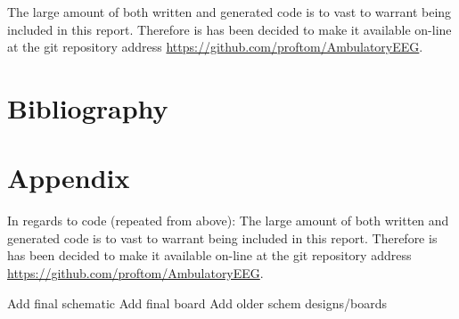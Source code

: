 \documentclass[]{article}
\begin{document}
The large amount of both written and generated code is to vast to warrant being included in this report. Therefore is has been decided to make it available on-line at the git repository address 
\url{https://github.com/proftom/AmbulatoryEEG}.
\clearpage
\section{Bibliography}

\nocite{*}

\printbibliography

\section{Appendix}

In regards to code (repeated from above): The large amount of both written and generated code is to vast to warrant being included in this report. Therefore is has been decided to make it  available on-line at the git repository address 
\url{https://github.com/proftom/AmbulatoryEEG}.

Add final schematic
Add final board
Add older schem designs/boards
\end{document}

